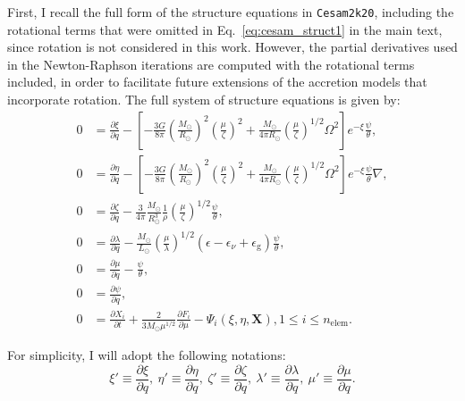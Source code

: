 \documentclass[12pt,a4paper]{article}
\newcommand{\mr}{\mathrm}
\newcommand{\pfird}[2][]{\frac{\partial#1}{\partial#2}}
\newcommand{\bvec}[1]{\boldsymbol{#1}}
\begin{document}
First, I recall the full form of the structure equations in \texttt{Cesam2k20}, including the rotational terms that were omitted in Eq.~\eqref{eq:cesam_struct1} in the main text, since rotation is not considered in this work. However, the partial derivatives used in the Newton-Raphson iterations are computed with the rotational terms included, in order to facilitate future extensions of the accretion models that incorporate rotation. The full system of structure equations is given by:
\begin{subequations} \label{eq:cesam2k20_struct_eq_full}
  \begin{align}
    0 &= \pfird[\xi]{q} - \left[-\frac{3G}{8\pi}\left(\frac{M_\odot}{R_\odot}\right)^2\left(\frac{\mu}{\zeta}\right)^2 + \frac{M_\odot}{4\pi R_\odot}\left(\frac{\mu}{\zeta}\right)^{1/2} \Omega^2\right]e^{-\xi}\frac{\psi}{\theta}, \label{eq:cesam_struct1_full}\\
    0 &= \pfird[\eta]{q} - \left[-\frac{3G}{8\pi}\left(\frac{M_\odot}{R_\odot}\right)^2\left(\frac{\mu}{\zeta}\right)^2 + \frac{M_\odot}{4\pi R_\odot}\left(\frac{\mu}{\zeta}\right)^{1/2} \Omega^2\right]e^{-\xi}\frac{\psi}{\theta}\nabla, \label{eq:cesam_struct2_full}\\
    0 &= \pfird[\zeta]{q} - \frac{3}{4\pi}\frac{M_\odot}{R_\odot^3}\frac{1}{\rho}\left(\frac{\mu}{\zeta}\right)^{1/2}\frac{\psi}{\theta}, \label{eq:cesam_struct3_full}\\
    0 &= \pfird[\lambda]{q} - \frac{M_\odot}{L_\odot}\left(\frac{\mu}{\lambda}\right)^{1/2}(\epsilon  - \epsilon_\nu + \epsilon_\mr{g})\frac{\psi}{\theta}, \label{eq:cesam_struct4_full}\\
    0 &= \pfird[\mu]{q} - \frac{\psi}{\theta}, \label{eq:cesam_struct5_full}\\
    0 &= \pfird[\psi]{q}, \label{eq:cesam_struct6_full}\\
    0 &= \pfird[X_i]{t} + \frac{2}{3 M_\odot\mu^{1/2}}\pfird[F_i]{\mu} - \Psi_i(\xi, \eta, \bvec{X}), 1\leq i \leq n_\mr{elem}. \label{eq:cesam_struct7_full}
  \end{align}
\end{subequations}

For simplicity, I will adopt the following notations:
\begin{equation}
  \xi' \equiv \pfird[\xi]{q},\ \eta' \equiv \pfird[\eta]{q},\ \zeta' \equiv \pfird[\zeta]{q},\ \lambda' \equiv \pfird[\lambda]{q},\ \mu' \equiv \pfird[\mu]{q}.
\end{equation}
\end{document}
